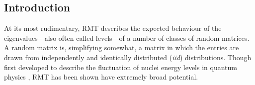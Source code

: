 \documentclass[12pt]{spieman}  %
\begin{document}
\begin{spacing}{2}   %

\section{Introduction}
\label{sect:intro}  %

At its most rudimentary, RMT describes the expected behaviour of the
eigenvalues—also often called levels—of a number of classes of random
matrices\cite{andersonIntroductionRandomMatrices2010,
akemannOxfordHandbookRandom2011, mehtaRandomMatrices2004}. A random matrix is,
simplifying somewhat, a matrix in which the entries are drawn from
independently and identically distributed (\textit{iid}) distributions. Though
first developed to describe the fluctuation of nuclei energy levels in quantum
physics \cite{mehtaRandomMatrices2004, guhrRandommatrixTheoriesQuantum1998a},
RMT has been shown have extremely broad potential.


\end{spacing}
\end{document}
